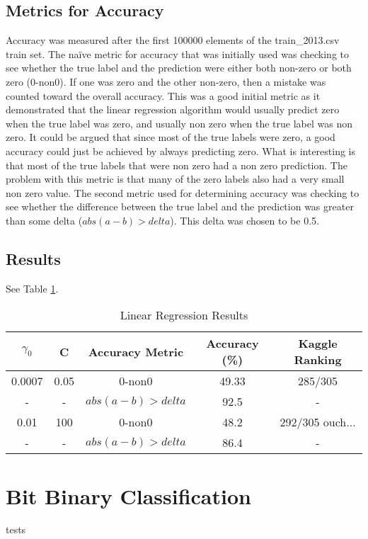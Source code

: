 \documentclass[pdftex,a4paper,12pt]{article}
\begin{document}
\subsection{Metrics for Accuracy}
Accuracy was measured after the first 100000 elements of the train\_2013.csv train set. The na{\"i}ve metric for accuracy that was initially used was checking to see whether the true label and the prediction were either both non-zero or both zero (0-non0). If one was zero and the other non-zero, then a mistake was counted toward the overall accuracy. This was a good initial metric as it demonstrated that the linear regression algorithm would usually predict zero when the true label was zero, and usually non zero when the true label was non zero. It could be argued that since most of the true labels were zero, a good accuracy could just be achieved by always predicting zero. What is interesting is that most of the true labels that were non zero had a non zero prediction. The problem with this metric is that many of the zero labels also had a very small non zero value. The second metric used for determining accuracy was checking to see whether the difference between the true label and the prediction was greater than some delta ($abs(a - b) > delta$). This delta was chosen to be 0.5.
\subsection{Results}
See Table \ref{table:linAcc}.
  \begin{table}[h]
        {\centering
          \begin{tabular}{|c|c|c|c|c|}
            \hline
             $\gamma_0$ & C & Accuracy Metric & Accuracy (\%) & Kaggle Ranking\\
            \hline
                0.0007 &   0.05        & 0-non0 & 49.33 & 285/305 \\
             \hline
                - &   -        & $abs(a - b) > delta$ & 92.5 & - \\
                  \hline
                0.01 &  100         &  0-non0  & 48.2 & 292/305   ouch... \\
          \hline
                - &  -         & $abs(a - b) > delta$ & 86.4 & - \\
             \hline
          \end{tabular}
          \caption{Linear Regression Results}          
          \label{table:linAcc}}
  \end{table}
\section{Bit Binary Classification}

\cite{cherkassky1999buckets}

tests



\end{document}
